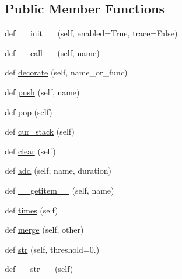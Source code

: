 \subsection*{Public Member Functions}
\begin{DoxyCompactItemize}
\item 
def \mbox{\hyperlink{classpysc2_1_1lib_1_1stopwatch_1_1_stop_watch_ac8f219c810684d77e8d2d94f5e7aa271}{\+\_\+\+\_\+init\+\_\+\+\_\+}} (self, \mbox{\hyperlink{classpysc2_1_1lib_1_1stopwatch_1_1_stop_watch_a7ef71d8389c2f81c3194986f4343736e}{enabled}}=True, \mbox{\hyperlink{classpysc2_1_1lib_1_1stopwatch_1_1_stop_watch_a953ca11fe39ca3fb2d7a8c9b5cab0695}{trace}}=False)
\item 
def \mbox{\hyperlink{classpysc2_1_1lib_1_1stopwatch_1_1_stop_watch_a37f8cde10a5ad19daa03b1502deef325}{\+\_\+\+\_\+call\+\_\+\+\_\+}} (self, name)
\item 
def \mbox{\hyperlink{classpysc2_1_1lib_1_1stopwatch_1_1_stop_watch_a506109bfd7df110925425466a59c0c13}{decorate}} (self, name\+\_\+or\+\_\+func)
\item 
def \mbox{\hyperlink{classpysc2_1_1lib_1_1stopwatch_1_1_stop_watch_a2f99d8b7587c25a4184da0ed7f3570b1}{push}} (self, name)
\item 
def \mbox{\hyperlink{classpysc2_1_1lib_1_1stopwatch_1_1_stop_watch_a875fd6c31e7c755974a76d2e6928ff43}{pop}} (self)
\item 
def \mbox{\hyperlink{classpysc2_1_1lib_1_1stopwatch_1_1_stop_watch_a759df931b3202016cd9a30698c77be1f}{cur\+\_\+stack}} (self)
\item 
def \mbox{\hyperlink{classpysc2_1_1lib_1_1stopwatch_1_1_stop_watch_a771061ad85cf730f642317c091c95a10}{clear}} (self)
\item 
def \mbox{\hyperlink{classpysc2_1_1lib_1_1stopwatch_1_1_stop_watch_a3462ad000bfa5c8b6a92482772840d28}{add}} (self, name, duration)
\item 
def \mbox{\hyperlink{classpysc2_1_1lib_1_1stopwatch_1_1_stop_watch_ad8dc8f5cf6bb11796e0309c8f7717cf9}{\+\_\+\+\_\+getitem\+\_\+\+\_\+}} (self, name)
\item 
def \mbox{\hyperlink{classpysc2_1_1lib_1_1stopwatch_1_1_stop_watch_a30e36bd45ab8e1398b6ca5d52e6a255d}{times}} (self)
\item 
def \mbox{\hyperlink{classpysc2_1_1lib_1_1stopwatch_1_1_stop_watch_a59d7e0986c4de0c33aa63c027e109a47}{merge}} (self, other)
\item 
def \mbox{\hyperlink{classpysc2_1_1lib_1_1stopwatch_1_1_stop_watch_a163c0391e3f3faef71eb21de71b60391}{str}} (self, threshold=0.)
\item 
def \mbox{\hyperlink{classpysc2_1_1lib_1_1stopwatch_1_1_stop_watch_a1f7ffa52fb52dba1b9e4a2e941670478}{\+\_\+\+\_\+str\+\_\+\+\_\+}} (self)
\end{DoxyCompactItemize}
